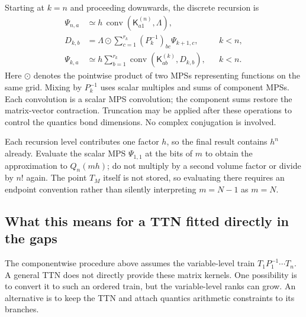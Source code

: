 \documentclass[11pt]{article}
\begin{document}
Starting at $k=n$ and proceeding downwards, the discrete recursion is
\begin{equation}
    \boxed{\begin{aligned}
    \Psi_{n,a}
        &\simeq h\,\operatorname{conv}(\mathsf K^{(n)}_{a1},\Lambda),\\
    D_{k,b}
        &=\Lambda\odot\sum_{c=1}^{r_k}{(P_k^{-1})}_{bc}\Psi_{k+1,c},
        &&k<n,\\
    \Psi_{k,a}
        &\simeq h\sum_{b=1}^{r_k}
            \operatorname{conv}(\mathsf K^{(k)}_{ab},D_{k,b}),
        &&k<n.
    \end{aligned}}
    \label{eq:quantics_recursion}
\end{equation}
Here $\odot$ denotes the pointwise product of two MPSs representing
functions on the same grid. Mixing by $P_k^{-1}$ uses scalar multiples
and sums of component MPSs. Each convolution is a scalar MPS convolution;
the component sums restore the matrix-vector contraction.
Truncation may be applied after these operations to control the quantics
bond dimensions. No complex conjugation is involved.

Each recursion level contributes one factor $h$, so the final result
contains $h^n$ already. Evaluate the scalar MPS $\Psi_{1,1}$ at the bits
of $m$ to obtain the approximation to $Q_n(mh)$; do not multiply by a
second volume factor or divide by ${n!}$ again. The point $T_M$ itself is
not stored, so evaluating there requires an endpoint convention rather
than silently interpreting $m=N-1$ as $m=N$.

\subsection{What this means for a TTN fitted directly in the gaps}

The componentwise procedure above assumes the variable-level train
$T_1P_1^{-1}\cdots T_n$. A general TTN does not directly provide these
matrix kernels. One possibility is to convert it to such an ordered train,
but the variable-level ranks can grow. An alternative is to keep the TTN
and attach quantics arithmetic constraints to its branches.
\end{document}

